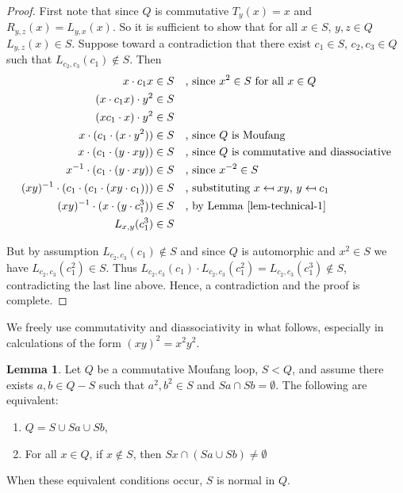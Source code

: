 \documentclass[12pt, twoside, openright]{report}
\theoremstyle{definition}
\newtheorem{lem}[thm]{Lemma}
\begin{document}
\begin{proof}
  First note that since $Q$ is commutative $T_y(x) = x$ and $R_{y, z}(x) = L_{y, x}(x)$. So it is
    sufficient to show that for all $x\in S$, $y, z\in Q$ $L_{y, z}(x) \in S$. Suppose toward a
    contradiction that there exist $c_1\in S$, $c_2, c_3\in Q$ such that $L_{c_2, c_3}(c_1)\notin S$. Then
  \begin{alignat*}{2}
    x\cdot c_1 x &\in S &&\text{, since $x^2\in S$ for all $x\in Q$}\\
    (x\cdot c_1 x)\cdot y^2 &\in S &&\\
    (xc_1\cdot x)\cdot y^2 &\in S &&\\
    x\cdot(c_1\cdot (x\cdot y^2)) &\in S &&\text{, since $Q$ is Moufang}\\
    x\cdot (c_1\cdot (y\cdot xy)) &\in S &&\text{, since $Q$ is commutative and diassociative}\\
    x^{-1}\cdot(c_1\cdot(y\cdot xy)) &\in S &&\text{, since $x^{-2}\in S$}\\
    (xy)^{-1}\cdot(c_1\cdot(c_1\cdot (xy\cdot c_1))) &\in S
      &&\text{, substituting $x\mapsfrom xy$, $y\mapsfrom c_1$}\\
    (xy)^{-1}\cdot (x\cdot(y\cdot c_1^3)) &\in S &&\text{, by Lemma \ref{lem-technical-1}}\\
    L_{x,y}(c_1^3) &\in S &&
  \end{alignat*}

  But by assumption $L_{c_2, c_3}(c_1)\notin S$ and since $Q$ is automorphic and $x^2\in S$ we have
    $L_{c_2, c_3}(c_1^2)\in S$. Thus
    $L_{c_2, c_3}(c_1)\cdot L_{c_2, c_3}(c_1^2) = L_{c_2, c_3}(c_1^3)\notin S$, contradicting
    the last line above. Hence, a contradiction and the proof is complete.
\end{proof}

We freely use commutativity and diassociativity in what follows, especially in
  calculations of the form $(xy)^2 = x^2 y^2$.

\begin{lem}\label{lem-comMoufang}
  Let $Q$ be a commutative Moufang loop, $S < Q$, and assume there exists $a,b\in Q- S$ such
    that $a^2,b^2\in S$ and $Sa\cap Sb=\emptyset$. The following are equivalent:
  \begin{enumerate}
    \item $Q = S\cup Sa\cup Sb$, 
    \item For all $x\in Q$, if $x\not\in S$, then $Sx\cap (Sa\cup Sb)\neq \emptyset$
  \end{enumerate}
  When these equivalent conditions occur, $S$ is normal in $Q$.
\end{lem}
\end{document}
